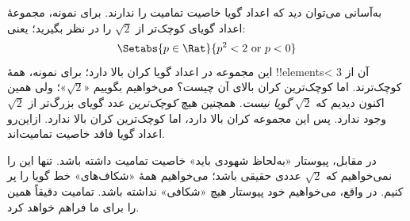 \documentclass[../../../include/open-logic-section]{subfiles}
\begin{document}
به‌آسانی می‌توان دید که اعداد گویا خاصیت تمامیت را ندارند. برای نمونه،
مجموعهٔ اعداد گویای کوچک‌تر از $\sqrt{2}$ را در نظر بگیرید؛ یعنی:
\[
	\Setabs{p \in \Rat}{p^2 < 2 \text{ or }p < 0}
\]
این مجموعه در اعداد گویا کران بالا دارد؛ برای نمونه، همهٔ !!{element}s<
آن از $3$ کوچک‌ترند. اما کوچک‌ترین کران بالای آن چیست؟ می‌خواهیم بگوییم
«$\sqrt{2}$»؛ ولی همین اکنون دیدیم که $\sqrt{2}$ \emph{گویا نیست}.
همچنین هیچ \emph{کوچک‌ترین} عدد گویای بزرگ‌تر از $\sqrt{2}$ وجود ندارد.
پس این مجموعه کران بالا دارد، اما کوچک‌ترین کران بالا ندارد. ازاین‌رو
اعداد گویا فاقد خاصیت تمامیت‌اند.

در مقابل، پیوستار «به‌لحاظ شهودی باید» خاصیت تمامیت داشته باشد. تنها
این را نمی‌خواهیم که $\sqrt{2}$ عددی حقیقی باشد؛ می‌خواهیم همهٔ
«شکاف‌های» خط گویا را پر کنیم. در واقع، می‌خواهیم خود پیوستار هیچ
«شکافی» نداشته باشد. تمامیت دقیقاً همین را برای ما فراهم خواهد کرد.
\end{document}

